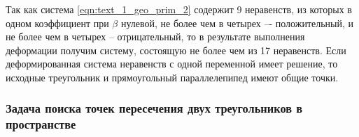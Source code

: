 Так как система \eqref{eqn:text_1_geo_prim_2} содержит 9 неравенств, из которых в одном коэффициент при $\beta$ нулевой, не более чем в четырех –- положительный, и не более чем в четырех -- отрицательный, то в результате выполнения деформации получим систему, состоящую не более чем из 17 неравенств.
Если деформированная система неравенств с одной переменной имеет решение, то исходные треугольник и прямоугольный параллелепипед имеют общие точки.

\subsubsection{Задача поиска точек пересечения двух треугольников в пространстве}

